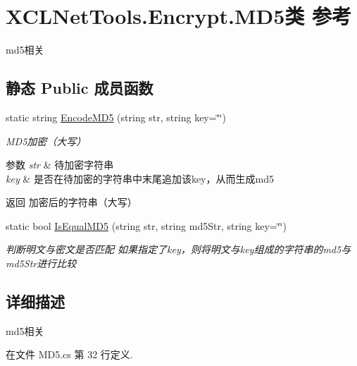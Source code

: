 \hypertarget{class_x_c_l_net_tools_1_1_encrypt_1_1_m_d5}{\section{X\-C\-L\-Net\-Tools.\-Encrypt.\-M\-D5类 参考}
\label{class_x_c_l_net_tools_1_1_encrypt_1_1_m_d5}
}


md5相关  


\subsection*{静态 Public 成员函数}
\begin{DoxyCompactItemize}
\item 
static string \hyperlink{class_x_c_l_net_tools_1_1_encrypt_1_1_m_d5_a146cf118c47e0693f82119d39f4b7ef1}{Encode\-M\-D5} (string str, string key=\char`\"{}\char`\"{})
\begin{DoxyCompactList}\small\item\em M\-D5加密（大写） 
\begin{DoxyParams}{参数}
{\em str} & 待加密字符串\\
\hline
{\em key} & 是否在待加密的字符串中末尾追加该key，从而生成md5\\
\hline
\end{DoxyParams}
\begin{DoxyReturn}{返回}
加密后的字符串（大写）
\end{DoxyReturn}
\end{DoxyCompactList}\item 
static bool \hyperlink{class_x_c_l_net_tools_1_1_encrypt_1_1_m_d5_a47f3bda0226d74bd2c9823a023ed8ed5}{Is\-Equal\-M\-D5} (string str, string md5\-Str, string key=\char`\"{}\char`\"{})
\begin{DoxyCompactList}\small\item\em 判断明文与密文是否匹配 如果指定了key，则将明文与key组成的字符串的md5与md5\-Str进行比较 \end{DoxyCompactList}\end{DoxyCompactItemize}


\subsection{详细描述}
md5相关 



在文件 M\-D5.\-cs 第 32 行定义.



